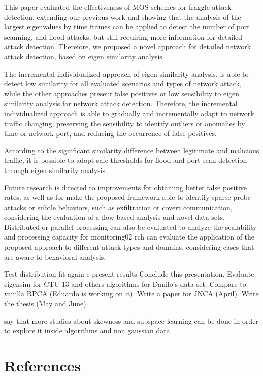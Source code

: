 \documentclass[review]{elsarticle}
\begin{document}
This paper evaluated the effectiveness of MOS schemes for fraggle attack detection, extending our previous work and showing that the analysis of the largest eigenvalues by time frames can be applied to detect the number of port scanning, and flood attacks, but still requiring more information for detailed attack detection. Therefore, we proposed a novel approach for detailed network attack detection, based on eigen similarity analysis.

The incremental individualized approach of eigen similarity analysis, is able to detect low similarity for all evaluated scenarios and types of network attack, while the other approaches present false positives or low sensibility to eigen similarity analysis for network attack detection. Therefore, the incremental individualized approach is able to gradually and incrementally adapt to network traffic changing, preserving the sensibility to identify outliers or anomalies by time or network port, and reducing the occurrence of false positives.

According to the significant similarity difference between legitimate and malicious traffic, it is possible to adopt safe thresholds for flood and port scan detection through eigen similarity analysis.

Future research is directed to improvements for obtaining better false positive rates, as well as for make the proposed framework able to identify sparse probe attacks or subtle behaviors, such as exfiltration or covert communication, considering the evaluation of a flow-based analysis and novel data sets. Distributed or parallel processing can also be evaluated to analyze the scalability and processing capacity for monitoring02       rch can evaluate the application of the proposed approach to different attack types and domains, considering cases that are aware to behavioral analysis.

Test distribution fit again e present results 
Conclude this presentation.
Evaluate eigensim for CTU-13 and others algorithms for Danilo's data set.
Compare to vanilla RPCA (Eduardo is working on it).
Write a paper for JNCA (April).
Write the thesis (May and June).

say that more studies about skewness and subspace learning can be done in order to explore it inside algorithms and non gaussian data

\section*{References}


\end{document}
